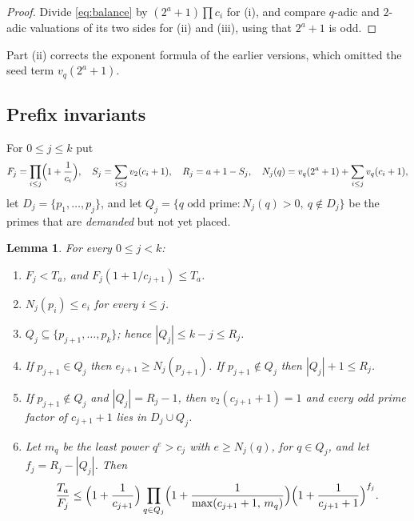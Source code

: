 \documentclass[11pt]{amsart}
\theoremstyle{plain}
\newtheorem{lemma}[theorem]{Lemma}
\theoremstyle{definition}
\begin{document}
\begin{proof}
Divide \eqref{eq:balance} by $(2^a+1)\prod c_i$ for (i), and compare
$q$-adic and $2$-adic valuations of its two sides for (ii) and (iii), using that
$2^a+1$ is odd.
\end{proof}

Part (ii) corrects the exponent formula of the earlier versions, which
omitted the seed term $v_q(2^a+1)$.

\subsection{Prefix invariants}
For $0\le j\le k$ put
\[
F_j=\prod_{i\le j}\Bigl(1+\frac1{c_i}\Bigr),\quad
S_j=\sum_{i\le j}v_2(c_i+1),\quad
R_j=a+1-S_j,\quad
N_j(q)=v_q(2^a+1)+\sum_{i\le j}v_q(c_i+1),
\]
let $D_j=\{p_1,\dots,p_j\}$, and let
$Q_j=\{q\text{ odd prime}: N_j(q)>0,\ q\notin D_j\}$ be the primes that are
\emph{demanded} but not yet placed.

\begin{lemma}\label{lem:prefix}
For every $0\le j<k$:
\begin{enumerate}[label=(\alph*),leftmargin=*]
\item $F_j<T_a$, and $F_j(1+1/c_{j+1})\le T_a$.
\item $N_j(p_i)\le e_i$ for every $i\le j$.
\item $Q_j\subseteq\{p_{j+1},\dots,p_k\}$; hence $|Q_j|\le k-j\le R_j$.
\item If $p_{j+1}\in Q_j$ then $e_{j+1}\ge N_j(p_{j+1})$.  If
$p_{j+1}\notin Q_j$ then $|Q_j|+1\le R_j$.
\item If $p_{j+1}\notin Q_j$ and $|Q_j|=R_j-1$, then $v_2(c_{j+1}+1)=1$ and
every odd prime factor of $c_{j+1}+1$ lies in $D_j\cup Q_j$.
\item Let $m_q$ be the least power $q^e>c_j$ with $e\ge N_j(q)$, for
$q\in Q_j$, and let $f_j=R_j-|Q_j|$. Then
\[
\frac{T_a}{F_j}\le\Bigl(1+\frac1{c_{j+1}}\Bigr)
\prod_{q\in Q_j}\Bigl(1+\frac1{\max(c_{j+1}+1,\,m_q)}\Bigr)
\Bigl(1+\frac1{c_{j+1}+1}\Bigr)^{f_j}.
\]
\end{enumerate}
\end{lemma}
\end{document}
